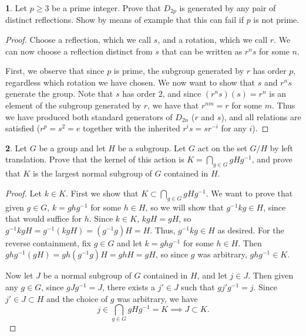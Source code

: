 \documentclass[12pt]{article}
\theoremstyle{definition}
\newtheorem{ex}{}
\begin{document}
\begin{ex}
	Let $p \geq 3$ be a prime integer.
	Prove that $D_{2p}$ is generated by any pair of distinct reflections.
	Show by means of example that this can fail if $p$ is not prime.
\end{ex}
\begin{proof}
	Choose a reflection, which we call $s$, and a rotation, which we call $r$.
	We can now choose a reflection distinct from $s$ that can be written as $r^ns$ for some $n$.

	First, we observe that since $p$ is prime, the subgroup generated by $r$ has order $p$, regardless which rotation we have chosen.
	We now want to show that $s$ and $r^ns$ generate the group.
	Note that $s$ has order 2, and since $(r^ns)(s) = r^n$ is an element of the subgroup generated by $r$, we have that $r^{nm} = r$ for some $m$.
	Thus we have produced both standard generators of $D_{2n}$ ($r$ and $s$), and all relations are satisfied ($r^p = s^2 = e$ together with the inherited $r^is = sr^{-i}$ for any $i$).
\end{proof}

\begin{ex}
	Let $G$ be a group and let $H$ be a subgroup.
	Let $G$ act on the set $G/H$ by left translation.
	Prove that the kernel of this action is $K = \bigcap_{g \in G} gHg^{-1}$, and prove that $K$ is the largest normal subgroup of $G$ contained in $H$.
\end{ex}
\begin{proof}
	Let $k \in K$.
	First we show that $K \subset \bigcap_{g \in G} gHg^{-1}$.
	We want to prove that given $g \in G$, $k = ghg^{-1}$ for some $h \in H$, so we will show that $g^{-1}kg \in H$, since that would suffice for $h$.
	Since $k \in K$, $kgH = gH$, so $g^{-1}kgH = g^{-1}(kgH) = (g^{-1}g)H = H$.
	Thus, $g^{-1}kg \in H$ as desired.
	For the reverse containment, fix $g \in G$ and let $k = ghg^{-1}$ for some $h \in H$.
	Then $ghg^{-1}(gH) = gh(g^{-1}g)H = ghH = gH$, so since $g$ was arbitrary, $ghg^{-1} \in K$.

	Now let $J$ be a normal subgroup of $G$ contained in $H$, and let $j \in J$.
	Then given any $g \in G$, since $gJg^{-1} = J$, there exists a $j' \in J$ such that $gj'g^{-1} = j$.
	Since $j' \in J \subset H$ and the choice of $g$ was arbitrary, we have \begin{equation*}
		j \in \bigcap_{g \in G}gHg^{-1} = K \implies J \subset K.
	\end{equation*}
\end{proof}
\end{document}
